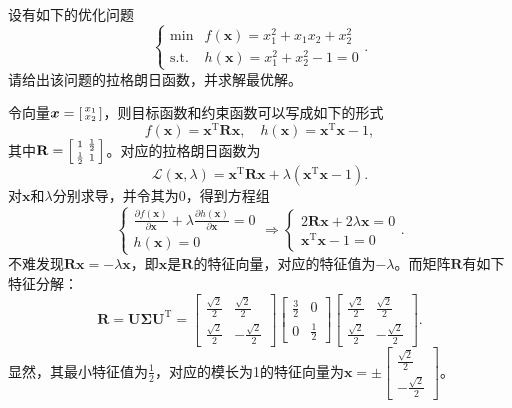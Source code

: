 \begin{example}
    设有如下的优化问题
    \[
        \begin{cases}
            \min          & f(\bm{x}) = x_1^2 + x_1x_2 +x_2^2 \\
            \mathrm{s.t.} & h(\bm{x}) = x_1^2 + x_2^2 - 1 = 0
        \end{cases}.
    \]
    请给出该问题的拉格朗日函数，并求解最优解。
\end{example}
\begin{solution}
    令向量\( \boldsymbol{x} = \begin{bsmallmatrix} x_1 \\ x_2 \end{bsmallmatrix} \)，则目标函数和约束函数可以写成如下的形式
    \[
        f(\bm{x}) = \bm{x}^{\mathrm{T}} \mathbf{R} \bm{x}, \quad h(\bm{x}) = \bm{x}^{\mathrm{T}} \bm{x} - 1,
    \]
    其中\( \mathbf{R} = \begin{bsmallmatrix} 1 & \frac{1}{2} \\ \frac{1}{2} & 1 \end{bsmallmatrix} \)。对应的拉格朗日函数为
    \[
        \mathcal{L}(\bm{x}, \lambda) = \bm{x}^{\mathrm{T}} \mathbf{R} \bm{x} + \lambda (\bm{x}^{\mathrm{T}} \bm{x} - 1).
    \]
    对\( \bm{x} \)和\( \lambda \)分别求导，并令其为0，得到方程组
    \[
        \begin{cases}
            \frac{\partial f(\bm{x})}{\partial \bm{x}} + \lambda \frac{\partial h(\bm{x})}{\partial \bm{x}} = 0 \\
            h(\bm{x}) = 0
        \end{cases} \Rightarrow
        \begin{cases}
            2\mathbf{R} \bm{x} + 2\lambda \bm{x} = 0 \\
            \bm{x}^{\mathrm{T}} \bm{x} - 1 = 0
        \end{cases}.
    \]
    不难发现\( \mathbf{R} \bm{x} = -\lambda \bm{x} \)，即\( \bm{x} \)是\( \mathbf{R} \)的特征向量，对应的特征值为\( -\lambda \)。而矩阵\( \mathbf{R} \)有如下特征分解：
    \[
        \mathbf{R} = \mathbf{U} \bm{\Sigma} \mathbf{U}^{\mathrm{T}} = \begin{bmatrix}
            \frac{\sqrt{2}}{2} & \frac{\sqrt{2}}{2}  \\
            \frac{\sqrt{2}}{2} & -\frac{\sqrt{2}}{2}
        \end{bmatrix} \begin{bmatrix}
            \frac{3}{2} & 0           \\
            0           & \frac{1}{2}
        \end{bmatrix} \begin{bmatrix}
            \frac{\sqrt{2}}{2} & \frac{\sqrt{2}}{2}  \\
            \frac{\sqrt{2}}{2} & -\frac{\sqrt{2}}{2}
        \end{bmatrix}.
    \]
    显然，其最小特征值为\( \frac{1}{2} \)，对应的模长为1的特征向量为\( \bm{x} = \pm \begin{bmatrix} \frac{\sqrt{2}}{2} \\ -\frac{\sqrt{2}}{2} \end{bmatrix} \)。


\end{solution}
